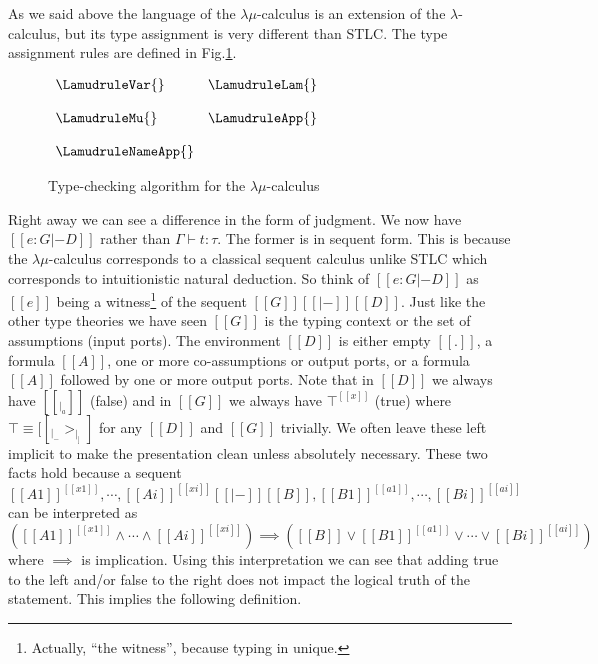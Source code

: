 As we said above the language of the $\lambda\mu$-calculus is an
extension of the $\lambda$-calculus, but its type assignment is very
different than STLC.  The type assignment rules are defined in
Fig.\ref{fig:lamu_typing}.
\begin{figure}
  \begin{center}
    \begin{math}
      \begin{array}{lll}
        \LamudruleVar{} & \LamudruleLam{}\\
          & \\
          \LamudruleMu{} & \LamudruleApp{}\\
          &\\
          \LamudruleNameApp{}
      \end{array}
    \end{math}
  \end{center}
  \caption{Type-checking algorithm for the $\lambda\mu$-calculus}
  \label{fig:lamu_typing}
\end{figure}
Right away we can see a difference in the form of judgment.  We now
have $[[e : G |- D]]$ rather than $\Gamma \vdash t :
\tau$.  The former is in sequent form.  This is because the
$\lambda\mu$-calculus corresponds to a classical sequent calculus
unlike STLC which corresponds to intuitionistic natural deduction.  So
think of $[[e : G |- D]]$ as $[[e]]$ being a
witness\footnote{Actually, ``the witness'', because typing in unique.}
of the sequent $[[G]] [[|-]] [[D]]$.  Just like the other type
theories we have seen $[[G]]$ is the typing context or the set of
assumptions (input ports).  The environment $[[D]]$ is either empty
$[[.]]$, a formula $[[A]]$, one or more co-assumptions or output
ports, or a formula $[[A]]$ followed by one or more output ports.
Note that in $[[D]]$ we always have $[[_|_ a]]$ (false) and in $[[G]]$ we
always have $\top^[[x]]$ (true) where $\top \equiv [[_|_ -> _|_]]$ for any
$[[D]]$ and $[[G]]$ trivially.  We often leave these left implicit to
make the presentation clean unless absolutely necessary.  These two
facts hold because a sequent $[[A1]]^{[[x1]]},\cdots,[[Ai]]^{[[xi]]}
[[|-]] [[B]],[[B1]]^{[[a1]]},\cdots,[[Bi]]^{[[ai]]}$ 
can be interpreted as 
$([[A1]]^{[[x1]]} \land \cdots \land [[Ai]]^{[[xi]]}) \implies ([[B]] \lor [[B1]]^{[[a1]]} \lor \cdots \lor [[Bi]]^{[[ai]]})$
where $\implies$ is implication.  Using this interpretation we can see that
adding true to the left and/or false to the right does not impact the logical
truth of the statement.  This implies the following definition.
